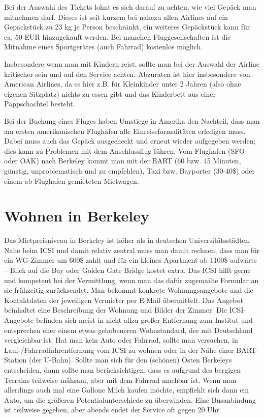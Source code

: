 \documentclass[a4paper]{scrreprt}
\begin{document}
Bei der Auswahl des Tickets lohnt es sich darauf zu achten, wie viel Gepäck man mitnehmen darf. Dieses ist seit kurzem bei nahezu allen Airlines auf ein Gepäckstück zu 23 kg je Person beschränkt, ein weiteres Gepäckstück kann für ca. 50 EUR hinzugekauft werden. Bei manchen Fluggesellschaften ist die Mitnahme eines Sportgerätes (auch Fahrrad) kostenlos möglich.

Insbesondere wenn man mit Kindern reist, sollte man bei der Auswahl der Airline kritischer sein und auf den Service achten. Abzuraten ist hier insbesondere von American Airlines, da es hier z.B. für Kleinkinder unter 2 Jahren (also ohne eigenen Sitzplatz) nichts zu essen gibt und das Kinderbett aus einer Pappschachtel besteht.

Bei der Buchung eines Fluges haben Umstiege in Amerika den Nachteil, dass man am ersten amerikanischen Flughafen alle Einreiseformalitäten erledigen muss. Dabei muss auch das Gepäck ausgecheckt und erneut wieder aufgegeben werden; dies kann zu Problemen mit dem Anschlussflug führen. Vom Flughafen (SFO oder OAK) nach Berkeley kommt man mit der BART (60 bzw. 45 Minuten, günstig, unproblematisch und zu empfehlen), Taxi bzw. Bayporter (30-40\$) oder einem ab Flughafen gemieteten Mietwagen.
 
\section{Wohnen in Berkeley}

Das Mietpreisniveau in Berkeley ist höher als in deutschen
Universitätsstädten. Nahe beim ICSI und damit relativ zentral muss man
damit rechnen, dass man für ein WG-Zimmer um 600\$ zahlt und für ein
kleines Apartment ab 1100\$ aufwärts -- Blick auf die Bay oder Golden
Gate Bridge kostet extra. Das ICSI hilft gerne und kompetent bei der
Vermittlung, wenn man das dafür zugemailte Formular an sie frühzeitig
zurücksendet. Man bekommt konkrete Wohnungsangebote und die
Kontaktdaten der jeweiligen Vermieter per E-Mail übermittelt. Das
Angebot beinhaltet eine Beschreibung der Wohnung und Bilder der
Zimmer. Die ICSI-Angebote befinden sich meist in nicht allzu großer
Entfernung zum Institut und entsprechen eher einem etwas gehobeneren
Wohnstandard, der mit Deutschland vergleichbar ist. Hat man kein Auto
oder Fahrrad, sollte man versuchen, in Lauf-/Fahrradfahrentfernung vom
ICSI zu wohnen oder in der Nähe einer BART-Station (der
U-Bahn). Sollte man sich für den (schönen) Osten Berkeleys
entscheiden, dann sollte man berücksichtigen, dass es aufgrund des
bergigen Terrains teilweise mühsam, aber mit dem Fahrrad machbar
ist. Wenn man allerdings auch mal eine Gallone Milch kaufen möchte,
empfiehlt sich dann ein Auto, um die größeren Potentialunterschiede zu
überwinden. Eine Busanbindung ist teilweise gegeben, aber abends endet
der Service oft gegen 20 Uhr.
\end{document}
